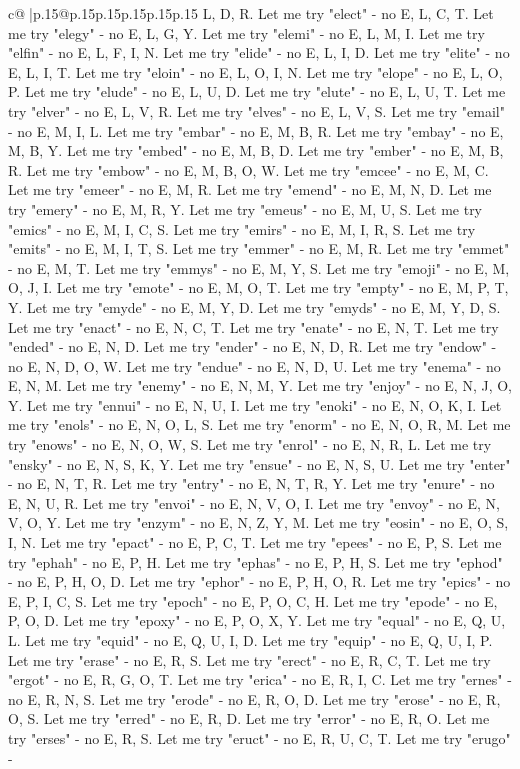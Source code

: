\documentclass{article}
\begin{document}
{\begin{supertabular}{c@{$\;$}|p{.15\linewidth}@{}p{.15\linewidth}p{.15\linewidth}p{.15\linewidth}p{.15\linewidth}p{.15\linewidth}}
{{{L, D, R. Let me try "elect" {-} no E, L, C, T. Let me try "elegy" {-} no E, L, G, Y. Let me try "elemi" {-} no E, L, M, I. Let me try "elfin" {-} no E, L, F, I, N. Let me try "elide" {-} no E, L, I, D. Let me try "elite" {-} no E, L, I, T. Let me try "eloin" {-} no E, L, O, I, N. Let me try "elope" {-} no E, L, O, P. Let me try "elude" {-} no E, L, U, D. Let me try "elute" {-} no E, L, U, T. Let me try "elver" {-} no E, L, V, R. Let me try "elves" {-} no E, L, V, S. Let me try "email" {-} no E, M, I, L. Let me try "embar" {-} no E, M, B, R. Let me try "embay" {-} no E, M, B, Y. Let me try "embed" {-} no E, M, B, D. Let me try "ember" {-} no E, M, B, R. Let me try "embow" {-} no E, M, B, O, W. Let me try "emcee" {-} no E, M, C. Let me try "emeer" {-} no E, M, R. Let me try "emend" {-} no E, M, N, D. Let me try "emery" {-} no E, M, R, Y. Let me try "emeus" {-} no E, M, U, S. Let me try "emics" {-} no E, M, I, C, S. Let me try "emirs" {-} no E, M, I, R, S. Let me try "emits" {-} no E, M, I, T, S. Let me try "emmer" {-} no E, M, R. Let me try "emmet" {-} no E, M, T. Let me try "emmys" {-} no E, M, Y, S. Let me try "emoji" {-} no E, M, O, J, I. Let me try "emote" {-} no E, M, O, T. Let me try "empty" {-} no E, M, P, T, Y. Let me try "emyde" {-} no E, M, Y, D. Let me try "emyds" {-} no E, M, Y, D, S. Let me try "enact" {-} no E, N, C, T. Let me try "enate" {-} no E, N, T. Let me try "ended" {-} no E, N, D. Let me try "ender" {-} no E, N, D, R. Let me try "endow" {-} no E, N, D, O, W. Let me try "endue" {-} no E, N, D, U. Let me try "enema" {-} no E, N, M. Let me try "enemy" {-} no E, N, M, Y. Let me try "enjoy" {-} no E, N, J, O, Y. Let me try "ennui" {-} no E, N, U, I. Let me try "enoki" {-} no E, N, O, K, I. Let me try "enols" {-} no E, N, O, L, S. Let me try "enorm" {-} no E, N, O, R, M. Let me try "enows" {-} no E, N, O, W, S. Let me try "enrol" {-} no E, N, R, L. Let me try "ensky" {-} no E, N, S, K, Y. Let me try "ensue" {-} no E, N, S, U. Let me try "enter" {-} no E, N, T, R. Let me try "entry" {-} no E, N, T, R, Y. Let me try "enure" {-} no E, N, U, R. Let me try "envoi" {-} no E, N, V, O, I. Let me try "envoy" {-} no E, N, V, O, Y. Let me try "enzym" {-} no E, N, Z, Y, M. Let me try "eosin" {-} no E, O, S, I, N. Let me try "epact" {-} no E, P, C, T. Let me try "epees" {-} no E, P, S. Let me try "ephah" {-} no E, P, H. Let me try "ephas" {-} no E, P, H, S. Let me try "ephod" {-} no E, P, H, O, D. Let me try "ephor" {-} no E, P, H, O, R. Let me try "epics" {-} no E, P, I, C, S. Let me try "epoch" {-} no E, P, O, C, H. Let me try "epode" {-} no E, P, O, D. Let me try "epoxy" {-} no E, P, O, X, Y. Let me try "equal" {-} no E, Q, U, L. Let me try "equid" {-} no E, Q, U, I, D. Let me try "equip" {-} no E, Q, U, I, P. Let me try "erase" {-} no E, R, S. Let me try "erect" {-} no E, R, C, T. Let me try "ergot" {-} no E, R, G, O, T. Let me try "erica" {-} no E, R, I, C. Let me try "ernes" {-} no E, R, N, S. Let me try "erode" {-} no E, R, O, D. Let me try "erose" {-} no E, R, O, S. Let me try "erred" {-} no E, R, D. Let me try "error" {-} no E, R, O. Let me try "erses" {-} no E, R, S. Let me try "eruct" {-} no E, R, U, C, T. Let me try "erugo" {-} }}}
\end{supertabular}}
\end{document}
